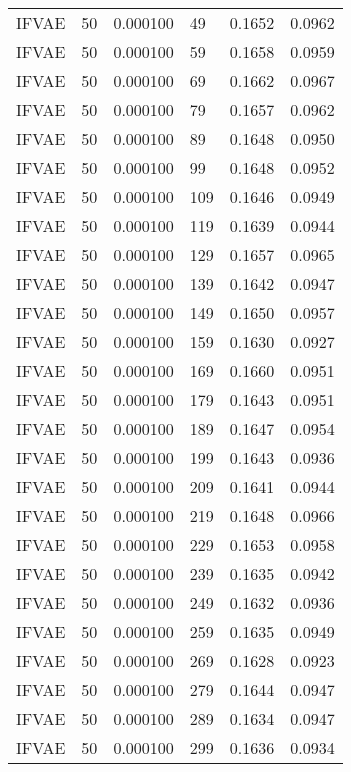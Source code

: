 \begin{tabular}{llrlrr}
   IFVAE &   50 &  0.000100 &    49 &  0.1652 &       0.0962 \\
   IFVAE &   50 &  0.000100 &    59 &  0.1658 &       0.0959 \\
   IFVAE &   50 &  0.000100 &    69 &  0.1662 &       0.0967 \\
   IFVAE &   50 &  0.000100 &    79 &  0.1657 &       0.0962 \\
   IFVAE &   50 &  0.000100 &    89 &  0.1648 &       0.0950 \\
   IFVAE &   50 &  0.000100 &    99 &  0.1648 &       0.0952 \\
   IFVAE &   50 &  0.000100 &   109 &  0.1646 &       0.0949 \\
   IFVAE &   50 &  0.000100 &   119 &  0.1639 &       0.0944 \\
   IFVAE &   50 &  0.000100 &   129 &  0.1657 &       0.0965 \\
   IFVAE &   50 &  0.000100 &   139 &  0.1642 &       0.0947 \\
   IFVAE &   50 &  0.000100 &   149 &  0.1650 &       0.0957 \\
   IFVAE &   50 &  0.000100 &   159 &  0.1630 &       0.0927 \\
   IFVAE &   50 &  0.000100 &   169 &  0.1660 &       0.0951 \\
   IFVAE &   50 &  0.000100 &   179 &  0.1643 &       0.0951 \\
   IFVAE &   50 &  0.000100 &   189 &  0.1647 &       0.0954 \\
   IFVAE &   50 &  0.000100 &   199 &  0.1643 &       0.0936 \\
   IFVAE &   50 &  0.000100 &   209 &  0.1641 &       0.0944 \\
   IFVAE &   50 &  0.000100 &   219 &  0.1648 &       0.0966 \\
   IFVAE &   50 &  0.000100 &   229 &  0.1653 &       0.0958 \\
   IFVAE &   50 &  0.000100 &   239 &  0.1635 &       0.0942 \\
   IFVAE &   50 &  0.000100 &   249 &  0.1632 &       0.0936 \\
   IFVAE &   50 &  0.000100 &   259 &  0.1635 &       0.0949 \\
   IFVAE &   50 &  0.000100 &   269 &  0.1628 &       0.0923 \\
   IFVAE &   50 &  0.000100 &   279 &  0.1644 &       0.0947 \\
   IFVAE &   50 &  0.000100 &   289 &  0.1634 &       0.0947 \\
   IFVAE &   50 &  0.000100 &   299 &  0.1636 &       0.0934 \\
\bottomrule
\end{tabular}
